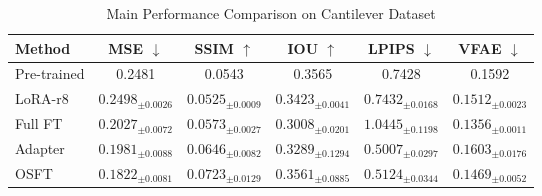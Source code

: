\begin{table}[t]
\caption{Main Performance Comparison on Cantilever Dataset}
\label{tab:main_results}
\begin{tabular}{lccccc}
\toprule
Method & MSE $\downarrow$ & SSIM $\uparrow$ & IOU $\uparrow$ & LPIPS $\downarrow$ & VFAE $\downarrow$ \\
\midrule
Pre-trained & 0.2481 & 0.0543 & 0.3565 & 0.7428 & 0.1592 \\
LoRA-r8 & $0.2498_{\pm 0.0026}$ & $0.0525_{\pm 0.0009}$ & $0.3423_{\pm 0.0041}$ & $0.7432_{\pm 0.0168}$ & $0.1512_{\pm 0.0023}$ \\
Full FT & $0.2027_{\pm 0.0072}$ & $0.0573_{\pm 0.0027}$ & $0.3008_{\pm 0.0201}$ & $1.0445_{\pm 0.1198}$ & $0.1356_{\pm 0.0011}$ \\
Adapter & $0.1981_{\pm 0.0088}$ & $0.0646_{\pm 0.0082}$ & $0.3289_{\pm 0.1294}$ & $0.5007_{\pm 0.0297}$ & $0.1603_{\pm 0.0176}$ \\
OSFT & $0.1822_{\pm 0.0081}$ & $0.0723_{\pm 0.0129}$ & $0.3561_{\pm 0.0885}$ & $0.5124_{\pm 0.0344}$ & $0.1469_{\pm 0.0052}$ \\
\bottomrule
\end{tabular}
\end{table}